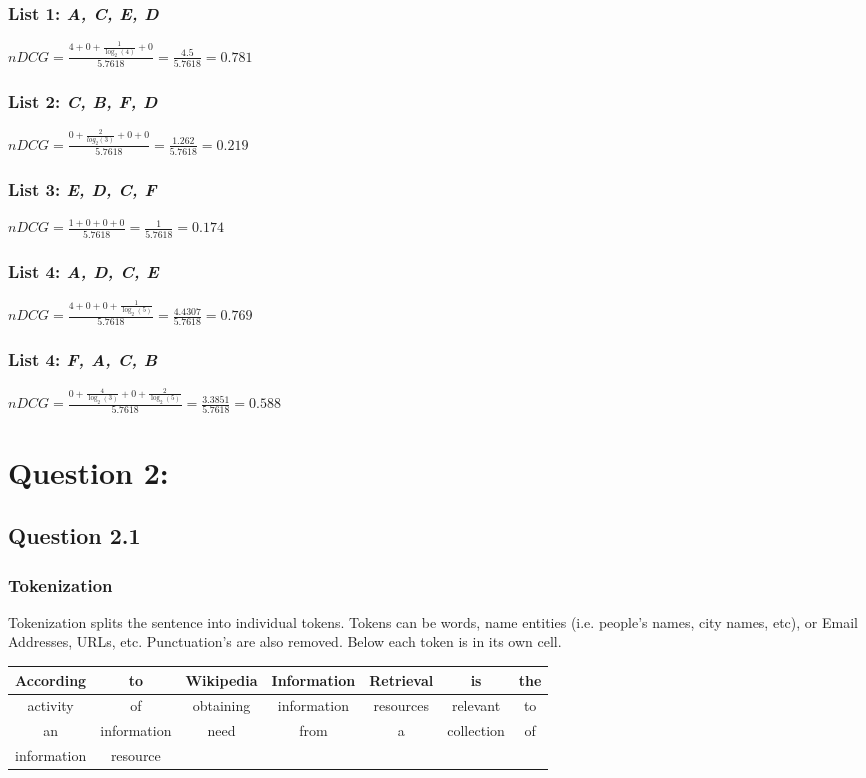 \subsubsection*{List 1: \textbf{\textit{A, C, E, D}}}
$nDCG = \frac{4 + 0 + \frac{1}{\log_2(4)} + 0}{5.7618} = \frac{4.5}{5.7618} = 0.781$

\subsubsection*{List 2: \textbf{\textit{C, B, F, D}}}
$nDCG = \frac{0 + \frac{2}{log_2(3)} + 0 + 0}{5.7618} = \frac{1.262}{5.7618} = 0.219$

\subsubsection*{List 3: \textbf{\textit{E, D, C, F}}}
$nDCG = \frac{1 + 0 + 0 + 0}{5.7618} = \frac{1}{5.7618} = 0.174$

\subsubsection*{List 4: \textbf{\textit{A, D, C, E}}}
$nDCG = \frac{4 + 0 + 0 + \frac{1}{\log_2(5)}}{5.7618} = \frac{4.4307}{5.7618} = 0.769$

\subsubsection*{List 4: \textbf{\textit{F, A, C, B}}}
$nDCG = \frac{0 + \frac{4}{\log_2(3)} + 0 + \frac{2}{\log_2(5)}}{5.7618} = \frac{3.3851}{5.7618} = 0.588$ 

\section*{Question 2: }

\subsection*{Question 2.1 }
\subsubsection*{Tokenization}
Tokenization splits the sentence into individual tokens. Tokens can be words, name entities (i.e. people's names, city names, etc), or Email Addresses, URLs, etc. Punctuation's are also removed. Below each token is in its own cell.
\begin{center}
\begin{tabular}{| c | c | c | c | c | c | c |} \hline
According & to & Wikipedia & Information & Retrieval & is & the \\ \hline
activity & of & obtaining & information & resources & relevant & to \\ \hline
an & information & need & from & a & collection & of \\ \hline
information & resource & & & & & \\ \hline
\end{tabular}
\end{center}


